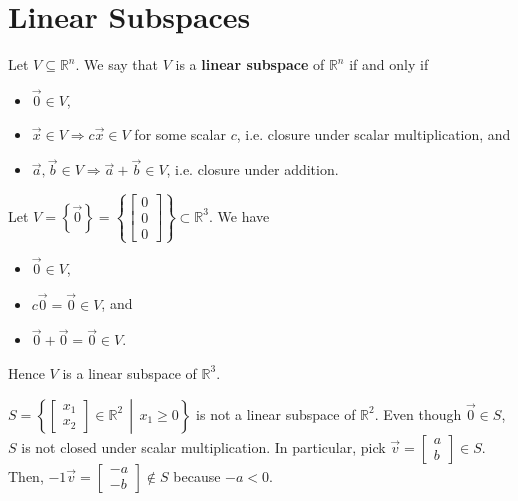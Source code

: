 \documentclass[]{book}
\newcommand{\vecxx}[1][x]{\ensuremath{\begin{bmatrix}
#1_1 \\
#1_2
\end{bmatrix}}}
\newcommand{\suchthat}{\,\middle|\,}
\begin{document}
\section{Linear Subspaces}
\begin{definition}
Let $V \subseteq \mathbb{R}^n$. We say that $V$ is a \textbf{linear subspace} of $\mathbb{R}^n$ if and only if
\begin{itemize}
    \item $\vec{0} \in V$,
    \item $\vec{x} \in V \Longrightarrow c\vec{x} \in V$ for some scalar $c$, i.e. closure under scalar multiplication, and
    \item $\vec{a},\vec{b} \in V \Longrightarrow \vec{a} + \vec{b} \in V$, i.e. closure under addition.
\end{itemize}
\end{definition}
\begin{example}
    Let $V=\left\{\vec{0}\right\} = \left\{\begin{bmatrix}0\\0\\0\end{bmatrix}\right\} \subset \mathbb{R}^3$. We have
    \begin{itemize}
        \item $\vec{0} \in V$,
        \item $c\vec{0} = \vec{0} \in V$, and
        \item $\vec{0} + \vec{0} = \vec{0} \in V$.
    \end{itemize}

    Hence $V$ is a linear subspace of $\mathbb{R}^3$. \hfill \qedsymbol
\end{example}
\begin{example}
    $S=\left\{\vecxx \in \mathbb{R}^2 \suchthat x_1 \geq 0 \right\}$ is not a linear subspace of $\mathbb{R}^2$. Even though $\vec{0} \in S$, $S$ is not closed under scalar multiplication. In particular, pick $\vec{v}=\begin{bmatrix}a \\ b\end{bmatrix} \in S$. Then, $-1\vec{v} = \begin{bmatrix}-a \\ -b\end{bmatrix} \notin S$ because $-a < 0$. \hfill \qedsymbol
\end{example}
\end{document}
